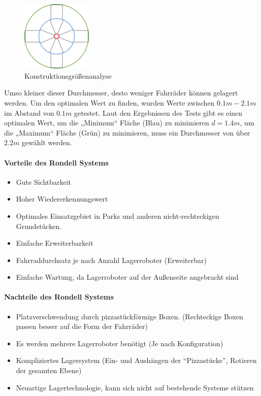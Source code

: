 \begin{figure}[H]
  \centering
  \includegraphics[width=0.3\textwidth]{images/konstruktionsgrößen.png}
  \caption{Konstruktionsgrößenanalyse}
  \label{fig:rondell_durchmesser}
\end{figure}

Umso kleiner dieser Durchmesser, desto weniger Fahrräder können gelagert werden. Um den optimalen Wert zu finden, wurden Werte zwischen $0.1m-2.1m$ im Abstand von $0.1m$ getestet. Laut den Ergebnissen des Tests gibt es einen optimalen Wert, um die „Minimum“ Fläche (Blau) zu minimieren $d=1.4m$, um die „Maximum“ Fläche (Grün) zu minimieren, muss ein Durchmesser von über $2.2m$ gewählt werden.

\paragraph{Vorteile des Rondell Systems}
\begin{itemize}
  \item Gute Sichtbarkeit
  \item Hoher Wiedererkennungswert
  \item Optimales Einsatzgebiet in Parks und anderen nicht-rechteckigen Grundstücken.
  \item Einfache Erweiterbarkeit
  \item \Gls{Fahrraddurchsatz} je nach Anzahl Lagerroboter (Erweiterbar)
  \item Einfache Wartung, da Lagerroboter auf der Außenseite angebracht sind
\end{itemize}

\paragraph{Nachteile des Rondell Systems}
\begin{itemize}
  \item Platzverschwendung durch pizzastückförmige Boxen. (Rechteckige Boxen passen besser auf die Form der Fahrräder)
  \item Es werden mehrere Lagerroboter benötigt (Je nach Konfiguration)
  \item Kompliziertes Lagersystem (Ein- und Aushängen der \enquote{Pizzastücke}, Rotieren der gesamten Ebene)
  \item Neuartige Lagertechnologie, kann sich nicht auf bestehende Systeme stützen
\end{itemize}
